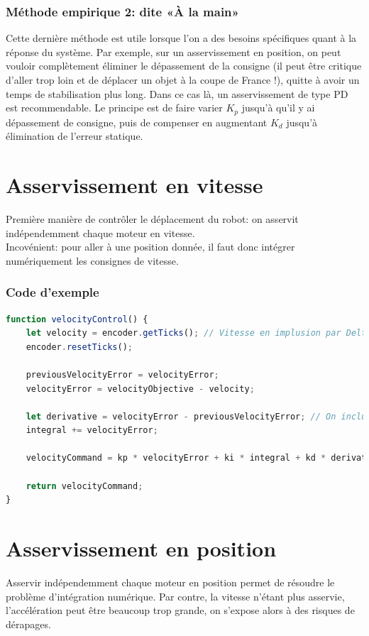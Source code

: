             \subsubsection{Méthode empirique 2: dite «À la main»}
                Cette dernière méthode est utile lorsque l'on a des besoins spécifiques quant à la réponse du système. Par exemple, sur un asservissement en position, on peut vouloir complètement éliminer le dépassement de la consigne (il peut être critique d'aller trop loin et de déplacer un objet à la coupe de France !), quitte à avoir un temps de stabilisation plus long. Dans ce cas là, un asservissement de type PD est recommendable. Le principe est de faire varier $K_p$ jusqu'à qu'il y ai dépassement de consigne, puis de compenser en augmentant $K_d$ jusqu'à élimination de l'erreur statique.

    \section{Asservissement en vitesse}
        Première manière de contrôler le déplacement du robot: on asservit indépendemment chaque moteur en vitesse.\\
        Incovénient: pour aller à une position donnée, il faut donc intégrer numériquement les consignes de vitesse.
    \subsubsection{Code d'exemple}
            \begin{lstlisting}[language=JavaScript]
function velocityControl() {
    let velocity = encoder.getTicks(); // Vitesse en implusion par DeltaT
    encoder.resetTicks();

    previousVelocityError = velocityError;
    velocityError = velocityObjective - velocity;

    let derivative = velocityError - previousVelocityError; // On inclut le 1/DeltaT dans K_d
    integral += velocityError;

    velocityCommand = kp * velocityError + ki * integral + kd * derivative;

    return velocityCommand;
}
            \end{lstlisting}

    \newpage
    \section{Asservissement en position}
        Asservir indépendemment chaque moteur en position permet de résoudre le  problème d'intégration numérique. Par contre, la vitesse n'étant plus asservie, l'accélération peut être beaucoup trop grande, on s'expose alors à des risques de dérapages.
